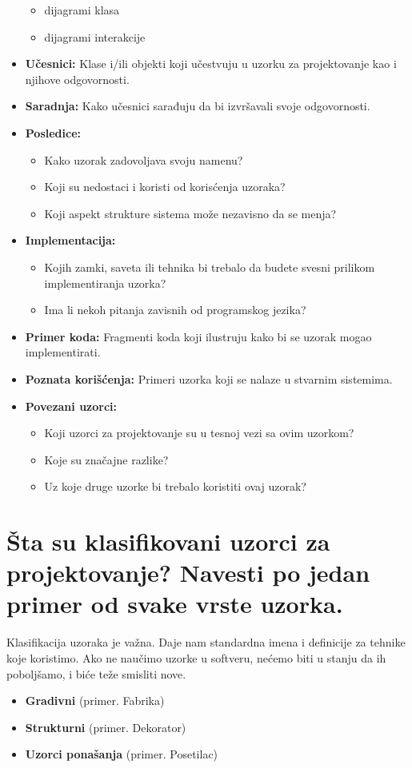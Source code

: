 \documentclass[a4paper]{article}
\begin{document}
\begin{itemize}
          \begin{itemize}
            \item dijagrami klasa
            \item dijagrami interakcije
          \end{itemize}
    \item \textbf{Učesnici:} Klase i/ili objekti koji učestvuju u uzorku za projektovanje kao i njihove odgovornosti.
    \item \textbf{Saradnja:} Kako učesnici sarađuju da bi izvršavali svoje odgovornosti.
    \item \textbf{Posledice:}
          \begin{itemize}
            \item Kako uzorak zadovoljava svoju namenu?
            \item Koji su nedostaci i koristi od korisćenja uzoraka?
            \item Koji aspekt strukture sistema može nezavisno da se menja?
          \end{itemize}
    \item \textbf{Implementacija:}
          \begin{itemize}
            \item Kojih zamki, saveta ili tehnika bi trebalo da budete svesni prilikom 
                  implementiranja uzorka?
            \item Ima li nekoh pitanja zavisnih od programskog jezika?
          \end{itemize}
    \item \textbf{Primer koda:} Fragmenti koda koji ilustruju kako bi se uzorak mogao implementirati.
    \item \textbf{Poznata korišćenja:} Primeri uzorka koji se nalaze u stvarnim sistemima.
    \item \textbf{Povezani uzorci:} 
          \begin{itemize}
            \item Koji uzorci za projektovanje su u tesnoj vezi sa ovim uzorkom?
            \item Koje su značajne razlike?
            \item Uz koje druge uzorke bi trebalo koristiti ovaj uzorak?
          \end{itemize}
  \end{itemize}

\section{Šta su klasifikovani uzorci za projektovanje? Navesti po jedan primer od svake vrste uzorka.}
  Klasifikacija uzoraka je važna. Daje nam standardna imena i definicije za tehnike koje koristimo. 
  Ako ne naučimo uzorke u softveru, nećemo biti u stanju da ih poboljšamo, i biće teže smisliti nove.
  \begin{itemize}
    \item \textbf{Gradivni} (primer. Fabrika)
    \item \textbf{Strukturni} (primer. Dekorator)
    \item \textbf{Uzorci ponašanja} (primer. Posetilac)
  \end{itemize}
\end{document}
